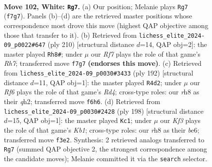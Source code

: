 \documentclass[11pt]{article}
\begin{document}
\clearpage

\begin{figure}[p]\centering
\begin{subfigure}{0.46\textwidth}\centering
\resizebox{\linewidth}{!}{%
\newchessgame
\chessboard[
  setfen={2k4r/5R2/5R2/8/8/5K2/8/8 w - - 1 102},
  showmover=false,
  pgfstyle=straightmove, color=movearrow, markmove={f7-g7}
]}
\caption{}
\end{subfigure}\hfill
\begin{subfigure}{0.46\textwidth}\centering
\resizebox{\linewidth}{!}{%
\newchessgame
\chessboard[
  setfen={3r1k2/7R/4RK2/8/8/8/8/8 w - - 19 106},
  showmover=false,
  pgfstyle=straightmove, color=movearrow, markmove={h7-h8}
]}
\caption{}
\end{subfigure}
\\[4pt]
\begin{subfigure}{0.46\textwidth}\centering
\resizebox{\linewidth}{!}{%
\newchessgame
\chessboard[
  setfen={8/8/8/1k6/3RK3/8/7q/3R4 w - - 8 97},
  showmover=false,
  pgfstyle=straightmove, color=movearrow, markmove={d4-d2}
]}
\caption{}
\end{subfigure}\hfill
\begin{subfigure}{0.46\textwidth}\centering
\resizebox{\linewidth}{!}{%
\newchessgame
\chessboard[
  setfen={8/r7/4b3/8/k7/8/1R6/1K6 w - - 30 100},
  showmover=false,
  pgfstyle=straightmove, color=movearrow, markmove={b1-c1}
]}
\caption{}
\end{subfigure}
\caption{\textbf{Move 102, White: \texttt{Rg7}.} (a) Our position; Melanie plays \texttt{Rg7} (\texttt{f7g7}). Panels (b)--(d) are the retrieved master positions whose correspondence most drove this move (highest QAP objective among those that transfer to it). (b) Retrieved from \texttt{lichess\_elite\_2024-09\_p0022\#647} (ply 210) [structural distance $d$=14, QAP obj=2]: the master played \texttt{Rh8\#}; under $\mu$ our \emph{Rf7} plays the role of that game's \emph{Rh7}; transferred move \texttt{f7g7} \textbf{(endorses this move)}. (c) Retrieved from \texttt{lichess\_elite\_2024-09\_p0030\#3433} (ply 192) [structural distance $d$=11, QAP obj=1]: the master played \texttt{R4d2}; under $\mu$ our \emph{Rf6} plays the role of that game's \emph{Rd4}; cross-type roles: our \emph{r}h8 as their \emph{q}h2; transferred move \texttt{f6h6}. (d) Retrieved from \texttt{lichess\_elite\_2024-09\_p0030\#2428} (ply 198) [structural distance $d$=15, QAP obj=1]: the master played \texttt{Kc1}; under $\mu$ our \emph{Kf3} plays the role of that game's \emph{Kb1}; cross-type roles: our \emph{r}h8 as their \emph{b}e6; transferred move \texttt{f3e2}. Synthesis: 2 retrieved analogs transferred to \texttt{Rg7} (summed QAP objective 2, the strongest correspondence among the candidate moves); Melanie committed it via the \texttt{search} selector.}
\label{fig:thought-m202}
\end{figure}
\end{document}
